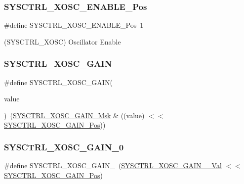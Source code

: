 \subsubsection{\texorpdfstring{SYSCTRL\_XOSC\_ENABLE\_Pos}{SYSCTRL\_XOSC\_ENABLE\_Pos}}
{\footnotesize\ttfamily \#define S\+Y\+S\+C\+T\+R\+L\+\_\+\+X\+O\+S\+C\+\_\+\+E\+N\+A\+B\+L\+E\+\_\+\+Pos~1}



(S\+Y\+S\+C\+T\+R\+L\+\_\+\+X\+O\+SC) Oscillator Enable 

\mbox{\label{group___s_a_m_d21___s_y_s_c_t_r_l_ga6aaac8210d433ed1aa7922b6718c239d}} 
\subsubsection{\texorpdfstring{SYSCTRL\_XOSC\_GAIN}{SYSCTRL\_XOSC\_GAIN}}
{\footnotesize\ttfamily \#define S\+Y\+S\+C\+T\+R\+L\+\_\+\+X\+O\+S\+C\+\_\+\+G\+A\+IN(\begin{DoxyParamCaption}\item[{}]{value }\end{DoxyParamCaption})~(\mbox{\hyperlink{group___s_a_m_d21___s_y_s_c_t_r_l_ga651d770bdd54dc52a81bb5b622ec7af7}{S\+Y\+S\+C\+T\+R\+L\+\_\+\+X\+O\+S\+C\+\_\+\+G\+A\+I\+N\+\_\+\+Msk}} \& ((value) $<$$<$ \mbox{\hyperlink{group___s_a_m_d21___s_y_s_c_t_r_l_ga1914a0f3776782e7aaf6830f903ce3af}{S\+Y\+S\+C\+T\+R\+L\+\_\+\+X\+O\+S\+C\+\_\+\+G\+A\+I\+N\+\_\+\+Pos}}))}

\mbox{\label{group___s_a_m_d21___s_y_s_c_t_r_l_gad399c32b1afb4341722d5c200f6688c4}} 
\subsubsection{\texorpdfstring{SYSCTRL\_XOSC\_GAIN\_0}{SYSCTRL\_XOSC\_GAIN\_0}}
{\footnotesize\ttfamily \#define S\+Y\+S\+C\+T\+R\+L\+\_\+\+X\+O\+S\+C\+\_\+\+G\+A\+I\+N\+\_~(\mbox{\hyperlink{group___s_a_m_d21___s_y_s_c_t_r_l_ga24cd4b97753abbae208eafc474f623e6}{S\+Y\+S\+C\+T\+R\+L\+\_\+\+X\+O\+S\+C\+\_\+\+G\+A\+I\+N\+\_\+\_\+\+Val}}       $<$$<$ \mbox{\hyperlink{group___s_a_m_d21___s_y_s_c_t_r_l_ga1914a0f3776782e7aaf6830f903ce3af}{S\+Y\+S\+C\+T\+R\+L\+\_\+\+X\+O\+S\+C\+\_\+\+G\+A\+I\+N\+\_\+\+Pos}})}

